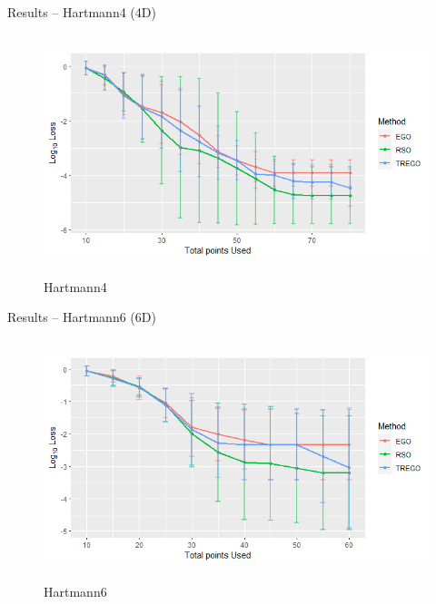 \documentclass{beamer}
\begin{document}
\begin{frame}{Results -- Hartmann4 (4D)}
\begin{figure}
\centering
\includegraphics[height=7cm]{../chapters/RSO/pdfs/hart4.png}
\small {Hartmann4}
\end{figure}
\end{frame}
\begin{frame}{Results -- Hartmann6 (6D)}
\begin{figure}
\centering
\includegraphics[height=7cm]{../chapters/RSO/pdfs/hart6.png}
\small {Hartmann6}
\end{figure}
\end{frame}
\end{document}
